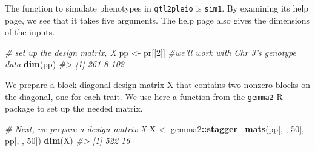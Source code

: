 \documentclass[oneside]{book}\usepackage[]{graphicx}\usepackage[]{color}
\newenvironment{Shaded}{\begin{snugshade}}{\end{snugshade}}
\newcommand{\CommentTok}[1]{\textcolor[rgb]{0.56,0.35,0.01}{\textit{#1}}}
\newcommand{\DecValTok}[1]{\textcolor[rgb]{0.00,0.00,0.81}{#1}}
\newcommand{\KeywordTok}[1]{\textcolor[rgb]{0.13,0.29,0.53}{\textbf{#1}}}
\newcommand{\NormalTok}[1]{#1}
\newcommand{\OperatorTok}[1]{\textcolor[rgb]{0.81,0.36,0.00}{\textbf{#1}}}
\newcommand{\StringTok}[1]{\textcolor[rgb]{0.31,0.60,0.02}{#1}}
\begin{document}
The function to simulate phenotypes in \texttt{qtl2pleio} is
\texttt{sim1}. By examining its help page, we see that it takes five
arguments. The help page also gives the dimensions of the inputs.

\begin{Shaded}
\begin{Highlighting}[]
\CommentTok{# set up the design matrix, X}
\NormalTok{pp <-}\StringTok{ }\NormalTok{pr[[}\DecValTok{2}\NormalTok{]]  }\CommentTok{#we'll work with Chr 3's genotype data}
\KeywordTok{dim}\NormalTok{(pp)}
\CommentTok{#> [1] 261   8 102}
\end{Highlighting}
\end{Shaded}

We prepare a block-diagonal design matrix X that contains two nonzero
blocks on the diagonal, one for each trait. We use here a function from
the \texttt{gemma2} R package to set up the needed matrix.

\begin{Shaded}
\begin{Highlighting}[]
\CommentTok{# Next, we prepare a design matrix X}
\NormalTok{X <-}\StringTok{ }\NormalTok{gemma2}\OperatorTok{::}\KeywordTok{stagger_mats}\NormalTok{(pp[, , }\DecValTok{50}\NormalTok{], pp[, , }\DecValTok{50}\NormalTok{])}
\KeywordTok{dim}\NormalTok{(X)}
\CommentTok{#> [1] 522  16}
\end{Highlighting}
\end{Shaded}
\end{document}
